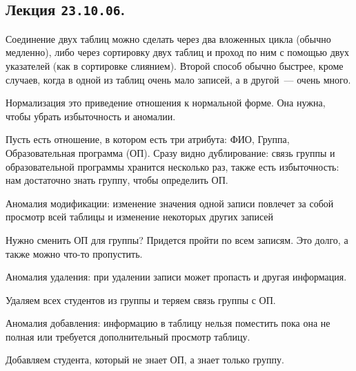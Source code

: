 \subsection{%
  Лекция \texttt{23.10.06}.%
}

Соединение двух таблиц можно сделать через два вложенных цикла (обычно
медленно), либо через сортировку двух таблиц и проход по ним с помощью двух
указателей (как в сортировке слиянием). Второй способ обычно быстрее, кроме
случаев, когда в одной из таблиц очень мало записей, а в другой~--- очень много.

\begin{definition}
  Нормализация это приведение отношения к нормальной форме. Она нужна, чтобы
  убрать избыточность и аномалии.
\end{definition}

Пусть есть  отношение, в котором есть три атрибута: ФИО, Группа,
Образовательная программа (ОП). Сразу видно дублирование: связь группы и
образовательной программы хранится несколько раз, также есть избыточность: нам
достаточно знать группу, чтобы определить ОП.

\begin{definition}
  Аномалия модификации: изменение значения одной записи повлечет за собой
  просмотр всей таблицы и изменение некоторых других записей
\end{definition}

\begin{example}
  Нужно сменить ОП для группы? Придется пройти по всем записям. Это долго, а
  также можно что-то пропустить.
\end{example}

\begin{definition}
  Аномалия удаления: при удалении записи может пропасть и другая информация.
\end{definition}

\begin{example}
  Удаляем всех студентов из группы и теряем связь группы с ОП.
\end{example}

\begin{definition}
  Аномалия добавления: информацию в таблицу нельзя поместить пока она не полная
  или требуется дополнительный просмотр таблицу.
\end{definition}

\begin{example}
  Добавляем студента, который не знает ОП, а знает только группу.
\end{example}

